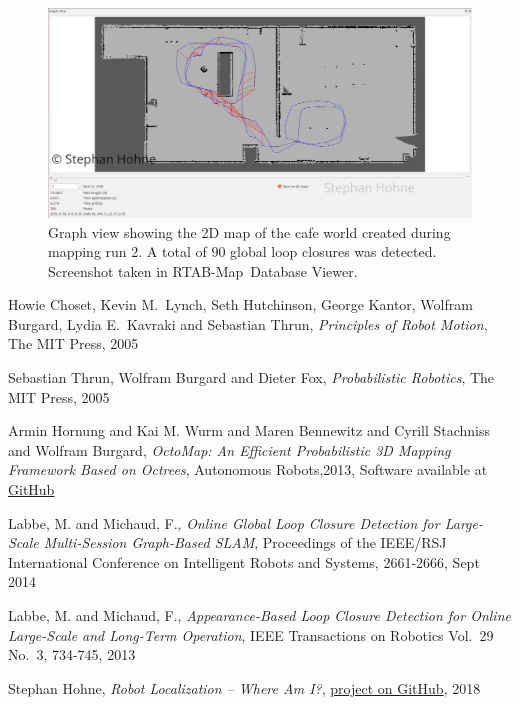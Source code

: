 \documentclass[10pt, journal, compsoc]{IEEEtran}
\newcommand{\rtab}{RTAB-Map}
\begin{document}
\begin{figure}[thpb]
      \centering
      \includegraphics[width=\textwidth]{images/rtabmap_graph_view_cafe.jpg}
      \caption{Graph view showing the 2D map of the cafe world created during mapping run $2$. A total of $90$ global loop closures was detected. Screenshot taken in \rtab\ Database Viewer.}
      \label{fig:graph_view_cafe}
\end{figure}


\begin{thebibliography}{6}

Howie Choset, Kevin M.\ Lynch, Seth Hutchinson, George Kantor, Wolfram Burgard, Lydia E.\ Kavraki and Sebastian Thrun, \textit{Principles of Robot Motion}, The MIT Press, 2005

Sebastian Thrun, Wolfram Burgard and Dieter Fox, \textit{Probabilistic Robotics}, The MIT Press, 2005

Armin Hornung and Kai M. Wurm and Maren Bennewitz and Cyrill Stachniss and Wolfram Burgard, \textit{OctoMap: An Efficient Probabilistic 3D Mapping Framework Based on Octrees}, Autonomous Robots,2013, Software available at \href{http://octomap.github.com}{GitHub}

Labbe, M. and Michaud, F., \textit{Online Global Loop Closure Detection for Large-Scale Multi-Session Graph-Based SLAM}, Proceedings of the IEEE/RSJ International Conference on Intelligent Robots and Systems, 2661-2666, Sept 2014

Labbe, M. and Michaud, F., \textit{Appearance-Based Loop Closure Detection for Online Large-Scale and Long-Term Operation}, IEEE Transactions on Robotics Vol.\ 29 No.\ 3, 734-745, 2013

Stephan Hohne, \textit{Robot Localization -- Where Am I?}, \href{https://github.com/S2H-Mobile/RoboND-Localization-Project}{project on GitHub}, 2018

\end{thebibliography}
\end{document}
